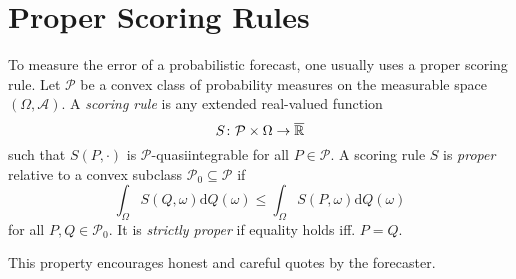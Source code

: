 \section{Proper Scoring Rules}
\label{sec:proper-scoring-rules}

To measure the error of a probabilistic forecast, one usually uses a 
proper scoring rule. 
Let \(\mathcal{P}\) be a convex class of probability measures on the 
measurable space \((\Omega, \mathcal{A})\).
A \textit{scoring rule} is any extended real-valued function 
\[ S\colon \mathcal{P} \times \Omega \rightarrow \overline{\mathbb{R}} \]
such that \(S(P, \cdot)\) is \(\mathcal{P}\)-quasiintegrable for all 
\(P\in \mathcal{P}\).
A scoring rule \(S\) is \textit{proper} relative to a convex subclass 
\(\mathcal{P}_0 \subseteq \mathcal{P}\) if
\[ \int_\Omega S(Q, \omega) \mathrm{d}Q(\omega) \leq \int_\Omega S(P, \omega) \mathrm{d}Q(\omega) \]
for all \(P, Q \in \mathcal{P}_0\). It is \textit{strictly proper} 
if equality holds iff. \(P = Q\).

This property encourages honest and careful quotes by the forecaster. 